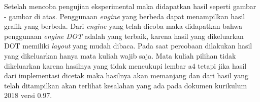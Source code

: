 Setelah mencoba pengujian eksperimental maka didapatkan hasil seperti gambar - gambar di atas. Penggunaan \textit{engine} yang berbeda dapat menampilkan hasil grafik yang berbeda. Dari \textit{engine} yang telah dicoba maka didapatkan bahwa penggunaan \textit{engine DOT} adalah yang terbaik, karena hasil yang dikeluarkan DOT memiliki \textit{layout} yang mudah dibaca. Pada saat percobaan dilakukan hasil yang dikeluarkan hanya mata kuliah wajib saja. Mata kuliah pilihan tidak dikeluarkan karena hasilnya yang tidak mencukupi lembar a4 tetapi jika hasil dari implementasi dicetak maka hasilnya akan memanjang dan dari hasil yang telah ditampilkan akan terlihat kesalahan yang ada pada dokumen kurikulum 2018 versi 0.97.